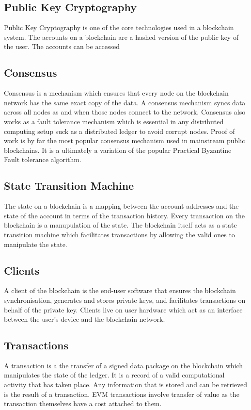 \documentclass[a4paper,twoside,phd]{BYUPhys}
\begin{document}
\subsection{Public Key Cryptography}
Public Key Cryptography is one of the core technologies used in a blockchain system. The accounts on a blockchain are a hashed version of the public key of the user. The accounts can be accessed 
\subsection{Consensus}
Consensus is a mechanism which ensures that every node on the blockchain network has the same exact copy of the data. A consensus mechanism syncs data across all nodes as and when those nodes connect to the network. Consensus also works as a fault tolerance mechanism which is essential in any distributed computing setup suck as a distributed ledger to avoid corrupt nodes. Proof of work is by far the most popular consensus mechanism used in mainstream public blockchains. It is a ultimately a variation of the popular Practical Byzantine Fault tolerance algorithm.
\subsection{State Transition Machine}
The state on a blockchain is a mapping between the account addresses and the state of the account in terms of the transaction history. Every transaction on the blockchain is a manupulation of the state. The blockchain itself acts as a state transition machine which facilitates transactions by allowing the valid ones to manipulate the state.
\subsection{Clients}
A client of the blockchain is the end-user software that ensures the blockchain synchronisation, generates and stores private keys, and facilitates transactions on behalf of the private key. Clients live on user hardware which act as an interface between the user's device and the blockchain network.
\subsection{Transactions}
A transaction is a the transfer of a signed data package on the blockchain which manipulates the state of the ledger. It is a record of a valid computational activity that has taken place. Any information that is stored and can be retrieved is the result of a transaction. EVM transactions involve transfer of value as the transaction themselves have a cost attached to them. 
\end{document}

